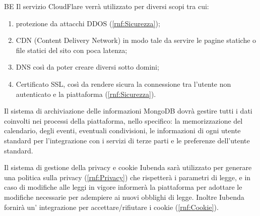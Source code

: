 \begin{listaPersonale}{BE}
     Il servizio CloudFlare verrà utilizzato per diversi scopi tra cui:
    \begin{enumerate}
        \item protezione da attacchi DDOS (\ref{rnf:Sicurezza});
        \item CDN (Content Delivery Network) in modo tale da servire le pagine statiche o file statici del sito con poca latenza;
        \item DNS così da poter creare diversi sotto domini;
        \item Certificato SSL, così da rendere sicura la connessione tra l'utente non autenticato e la piattaforma (\ref{rnf:Sicurezza}).
    \end{enumerate}

     Il sistema di archiviazione delle informazioni MongoDB dovrà gestire tutti i dati coinvolti nei processi della piattaforma, nello specifico: la memorizzazione del calendario, degli eventi, eventuali condivisioni, le informazioni di ogni utente standard per l'integrazione con i servizi di terze parti e le preferenze dell'utente standard.

     Il sistema di gestione della privacy e cookie Iubenda sarà utilizzato per generare una politica sulla privacy (\ref{rnf:Privacy}) che rispetterà i parametri di legge, e in caso di modifiche alle leggi in vigore informerà la piattaforma per adottare le modifiche necessarie per adempiere ai nuovi obblighi di legge. Inoltre Iubenda fornirà un' integrazione per accettare/rifiutare i cookie (\ref{rnf:Cookie}).

\end{listaPersonale}

